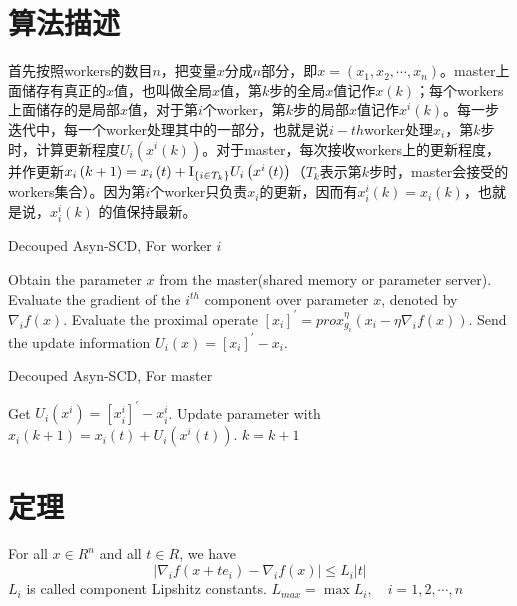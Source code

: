 \documentclass{ctexart}
\begin{document}
\section{算法描述}

首先按照workers的数目$n$，把变量$x$分成$n$部分，即$x=\left(x_1,x_2,\cdots,x_n\right)$。master上面储存有真正的$x$值，也叫做全局$x$值，第$k$步的全局$x$值记作$x\left(k\right)$；每个workers上面储存的是局部$x$值，对于第$i$个worker，第$k$步的局部$x$值记作$x^i \left(k\right)$。每一步迭代中，每一个worker处理其中的一部分，也就是说$i-th$worker处理$x_i$，第$k$步时，计算更新程度$U_i \left(x^i \left(k\right)\right)$。对于master，每次接收workers上的更新程度，并作更新${x_i}\left( {k + 1} \right) = {x_i}\left( t \right) + {{\rm I}_{\left\{ {i \in {T_k}} \right\}}}{U_i}\left( {{x^i}\left( t \right)} \right)$（$T_k$表示第$k$步时，master会接受的workers集合）。因为第$i$个worker只负责$x_i$的更新，因而有$x^i_i \left(k\right) = x_i \left(k\right)$，也就是说，$x^i_i \left(k\right)$ 的值保持最新。

\begin{algorithm}[h]
\caption{Decouped Asyn-SCD, For worker $i$}
\begin{algorithmic}[1]
    \REPEAT
    \STATE Obtain the parameter $x$ from the master(shared memory or parameter server).
    \STATE Evaluate the gradient of the $i^{th}$ component over parameter $x$, denoted by $\nabla_i f\left(x\right)$.
    \STATE Evaluate the proximal operate $\left[ x_i \right]^{'} = prox_{g_i}^\eta \left( x_i - \eta {\nabla _i}f\left( x \right) \right)$.
    \STATE Send the update information ${U_i}\left(x\right) = \left[ x_i \right]^{'} - x_i$.
\end{algorithmic}
\end{algorithm}

\begin{algorithm}[h]
\caption{Decouped Asyn-SCD, For master}
\begin{algorithmic}[1]
    \STATE Get $ {U_i}\left( {{x^i}} \right) = {\left[ {x_i^i} \right]^{'}} - x_i^i $.
    \STATE Update parameter with ${x_i}\left( {k + 1} \right) = {x_i}\left( t \right) + {U_i}\left( {{x^i}\left( t \right)} \right)$.
    \STATE $ k=k+1 $
    \ENDFOR
\end{algorithmic}
\end{algorithm}

\newpage
\section{定理}
\begin{myas}\label{as:1}
For all $x\in R^n $ and all $t\in R$, we have 
    \begin{equation}\label{aseq:1}
      \left|\nabla_i f\left( x+te_i \right)-\nabla_i f\left( x\right) \right| \leq L_i \left|t\right|
    \end{equation}
    $L_i$ is called component Lipshitz constants. $L_{max}=\max L_i ,\quad i = 1,2,\cdots,n$
\end{myas}
\end{document}
